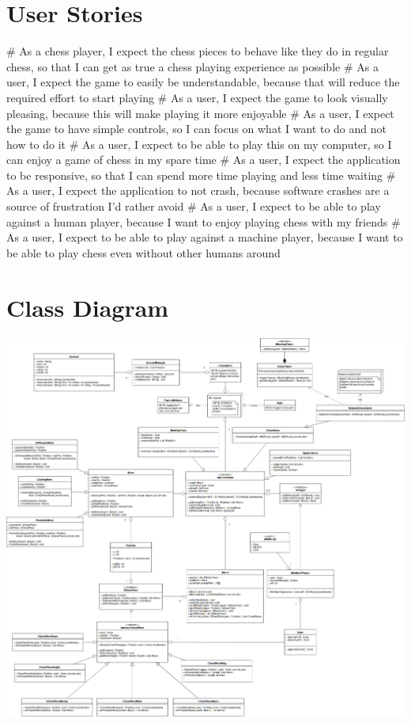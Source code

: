 \documentclass{article}
\begin{document}
\section*{User Stories}

\begin{easylist}[itemize]
# As a chess player, I expect the chess pieces to behave like they do in regular chess, so that I can get as true a chess playing experience as possible
# As a user, I expect the game to easily be understandable, because that will reduce the required effort to start playing
# As a user, I expect the game to look visually pleasing, because this will make playing it more enjoyable
# As a user, I expect the game to have simple controls, so I can focus on what I want to do and not how to do it
# As a user, I expect to be able to play this on my computer, so I can enjoy a game of chess in my spare time
# As a user, I expect the application to be responsive, so that I can spend more time playing and less time waiting
# As a user, I expect the application to not crash, because software crashes are a source of frustration I'd rather avoid
# As a user, I expect to be able to play against a human player, because I want to enjoy playing chess with my friends
# As a user, I expect to be able to play against a machine player, because I want to be able to play chess even without other humans around
\end{easylist}

\section*{Class Diagram}
\includegraphics[width=15cm]{classdiagram-v4}
\end{document}
